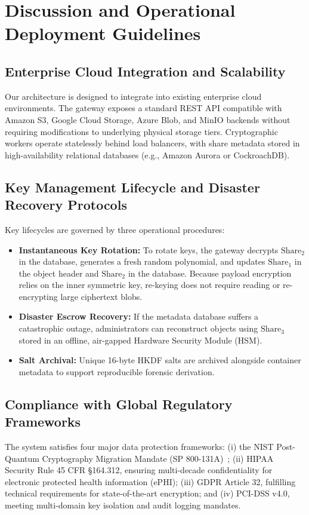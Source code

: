 \documentclass[sn-mathphys,Numbered]{sn-jnl}%
\theoremstyle{thmstyleone}%
\theoremstyle{thmstyletwo}%
\theoremstyle{thmstylethree}%
\begin{document}
\section{Discussion and Operational Deployment Guidelines}\label{sec:discussion}

\subsection{\textbf{Enterprise Cloud Integration and Scalability}}
Our architecture is designed to integrate into existing enterprise cloud environments. The gateway exposes a standard REST API compatible with Amazon S3, Google Cloud Storage, Azure Blob, and MinIO backends without requiring modifications to underlying physical storage tiers. Cryptographic workers operate statelessly behind load balancers, with share metadata stored in high-availability relational databases (e.g., Amazon Aurora or CockroachDB).

\subsection{\textbf{Key Management Lifecycle and Disaster Recovery Protocols}}
Key lifecycles are governed by three operational procedures:
\begin{itemize}
    \item \textbf{Instantaneous Key Rotation:} To rotate keys, the gateway decrypts $\text{Share}_2$ in the database, generates a fresh random polynomial, and updates $\text{Share}_1$ in the object header and $\text{Share}_2$ in the database. Because payload encryption relies on the inner symmetric key, re-keying does not require reading or re-encrypting large ciphertext blobs.
    \item \textbf{Disaster Escrow Recovery:} If the metadata database suffers a catastrophic outage, administrators can reconstruct objects using $\text{Share}_3$ stored in an offline, air-gapped Hardware Security Module (HSM).
    \item \textbf{Salt Archival:} Unique 16-byte HKDF salts are archived alongside container metadata to support reproducible forensic derivation.
\end{itemize}

\subsection{\textbf{Compliance with Global Regulatory Frameworks}}
The system satisfies four major data protection frameworks: (i) the NIST Post-Quantum Cryptography Migration Mandate (SP 800-131A)~\cite{nist2019sp800131a,enisa2021pqc,bsi2020quantum}; (ii) HIPAA Security Rule 45 CFR \S164.312, ensuring multi-decade confidentiality for electronic protected health information (ePHI); (iii) GDPR Article 32, fulfilling technical requirements for state-of-the-art encryption; and (iv) PCI-DSS v4.0, meeting multi-domain key isolation and audit logging mandates.
\end{document}
